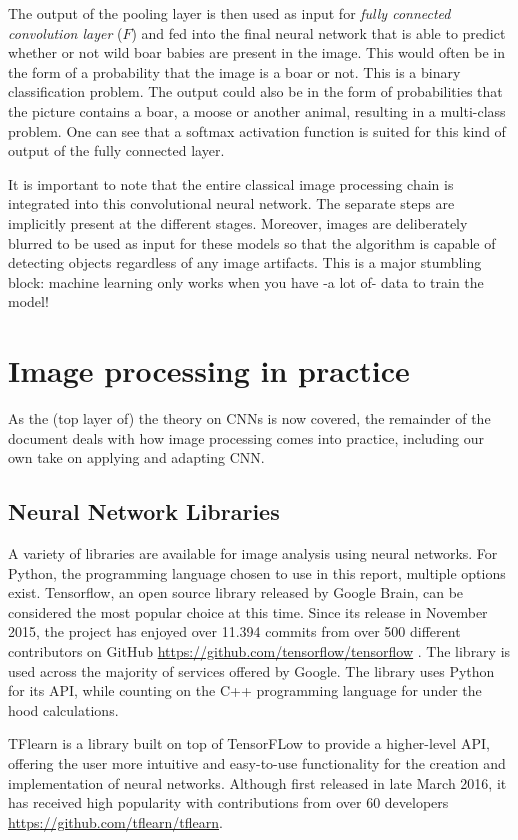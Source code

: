 The output of the pooling layer is then used as input for \textit{fully connected convolution layer} ($F$) and fed into the final neural network that is able to predict whether or not wild boar babies are present in the image. This would often be in the form of a probability that the image is a boar or not. This is a binary classification problem. The output could also be in the form of probabilities that the picture contains a boar, a moose or another animal, resulting in a multi-class problem. One can see that a softmax activation function is suited for this kind of output of the fully connected layer. 
 

It is important to note that the entire classical image processing chain is integrated into this convolutional neural network. The separate steps are implicitly present at the different stages. Moreover, images are deliberately blurred to be used as input for these models so that the algorithm is capable of detecting objects regardless of any image artifacts. This is a major stumbling block: machine learning only works when you have -a lot of- data to train the model! 
\section{Image processing in practice}
As the (top layer of) the theory on CNNs is now covered, the remainder of the document deals with how image processing comes into practice, including our own take on applying and adapting CNN.
\subsection{Neural Network Libraries \label{sec:libraries}}
A variety of libraries are available for image analysis using neural networks. For Python, the programming language chosen to use in this report, multiple options exist. Tensorflow, an open source library released by Google Brain, can be considered the most popular choice at this time. Since its release in November 2015, the project has enjoyed over 11.394 commits from over 500 different contributors on GitHub \url{https://github.com/tensorflow/tensorflow} . The library is used across the majority of services offered by Google. The library uses Python for its API, while counting on the C++ programming language for under the hood calculations. 


TFlearn is a library built on top of TensorFLow to provide a higher-level API, offering the user more intuitive and easy-to-use functionality for the creation and implementation of neural networks. Although first released in late March 2016, it has received high popularity with contributions from over 60 developers \url{https://github.com/tflearn/tflearn}.

